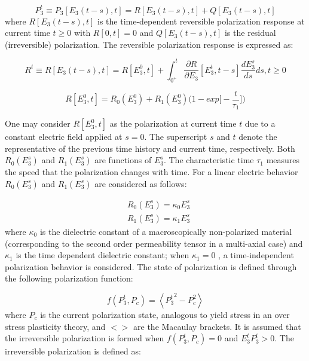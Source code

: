 \begin{equation}
P_3^t\equiv P_3[E_3(t-s),t]=R[E_3(t-s),t]+Q[E_3(t-s),t]
\label{EQN:polarization_decomposition}
\end{equation}
where $R[E_3(t-s),t]$ is the time-dependent reversible polarization response at current time $t\geq 0$ with $R[0,t]=0$ and $Q[E_3(t-s),t]$ is the residual (irreversible) polarization. The reversible polarization response is expressed as:

\begin{equation}
\label{EQN:RevPol}
R^t\equiv R[E_3(t-s),t]= R[E_3^0,t]+\int_{0^+}^t\frac{\partial R}{\partial E_3} [E_3^t,t-s] \frac{dE_3^s}{ds}ds , t \geq 0
\end{equation}

\begin{equation}
R[E_3^0,t]=R_0(E_3^0)+R_1(E_3^0)\big(1-exp\bigg[-\frac{t}{\tau_1}\bigg] \big)
\label{EQN:StaticRevPol}
\end{equation}

One may consider $R[E_3^0,t]$ as the polarization at current time $t$ due to a constant electric field applied at $s=0$. 
The superscript $s$ and $t$ denote the representative of the previous time history and current time, respectively.
 Both $R_0(E_3^s)$ and $R_1(E_3^s)$ are functions of $E_3^s$. The characteristic time $\tau_1$ measures the speed that the polarization changes with time.
 For a linear electric behavior $R_0(E_3^s)$ and $R_1(E_3^s)$ are considered as follows:

\begin{equation}
\begin{aligned}
&R_0(E_3^s)=\kappa_0 E_3^s \\
&R_1(E_3^s)=\kappa_1 E_3^s
\end{aligned}
\label{EQN:R0R1Defini}
\end{equation}
where $\kappa_0$ is the dielectric constant of a macroscopically non-polarized material
 (corresponding to the second order permeability tensor in a multi-axial case) and $\kappa_1$ is the time dependent dielectric constant;
 when $\kappa_1=0$ ,
 a time-independent polarization behavior is considered. 
The state of polarization is defined through the following polarization function:
 
\begin{equation}
\label{EQN:SurfacePol}
f(P_3^t,P_c)=\left< {P_3^t}^2-P_c^2 \right> 
\end{equation}
where $P_c$ is the current polarization state,
 analogous to yield stress in an over stress plasticity theory,
  and $<>$ are the Macaulay brackets.
It is assumed that the irreversible polarization is formed when $f(P_3^t,P_c)=0$ and $E_3^t P_3^t>0$. 
The irreversible polarization is defined as:

